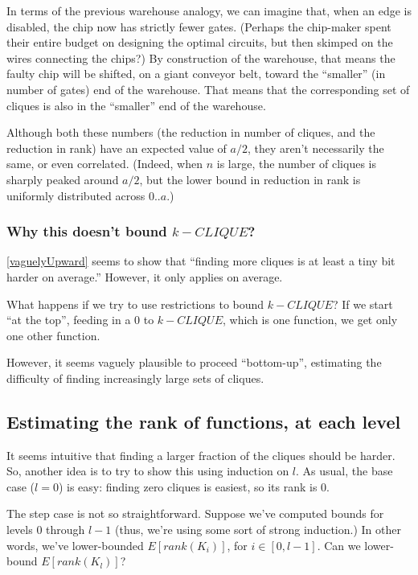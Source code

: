 \documentclass[12pt]{article}
\theoremstyle{definition}
\begin{document}
In terms of the previous warehouse analogy, we can imagine that,
when an edge is disabled, the chip now has strictly fewer gates.
(Perhaps the chip-maker spent their entire budget on designing the
optimal circuits, but then skimped on the wires connecting the chips?)
By construction of the warehouse, that means the faulty chip will be shifted,
on a giant conveyor belt,
toward the ``smaller'' (in number of gates) end of the warehouse.
That means that the corresponding set of cliques is also
in the ``smaller'' end of the warehouse.

Although both these numbers (the reduction in number of cliques, and
the reduction in rank) have an expected value of $a/2$,
they aren't necessarily the same, or even correlated.
(Indeed, when $n$ is large, the number of cliques is sharply peaked around $a/2$,
but the lower bound in reduction in rank is uniformly distributed across $0..a$.)

\subsubsection{Why this doesn't bound $k-CLIQUE$?}

\ref{vaguelyUpward} seems to show that ``finding more cliques is
at least a tiny bit harder on average.'' However, it only applies
on average.

What happens if we try to use restrictions to bound $k-CLIQUE$?
If we start ``at the top'',
feeding in a 0 to $k-CLIQUE$, which is one function,
we get only one other function.

However, it seems vaguely plausible to proceed ``bottom-up'',
estimating the difficulty of finding increasingly large
sets of cliques.

\subsection{Estimating the rank of functions, at each level}

It seems intuitive that finding a larger fraction of the cliques
should be harder.
So, another idea is to try to show this using induction on $l$.
As usual, the base case ($l=0$) is easy: finding zero cliques is easiest,
so its rank is 0.

The step case is not so straightforward. Suppose we've computed bounds for
levels 0 through $l-1$ (thus, we're using some sort of strong induction.)
In other words, we've lower-bounded $E[rank(K_i)]$, for $i \in [0,l-1]$.
Can we lower-bound $E[rank(K_l)]$?
\end{document}
